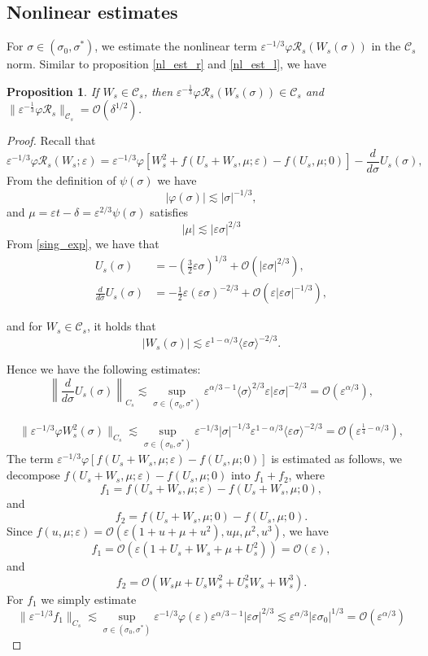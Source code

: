 \documentclass[letterpaper,11pt]{article}
\newcommand{\Ral}{\mathcal{R}}
\newcommand{\rmO}{\mathcal{O}}
\newcommand{\eps}{\varepsilon}
\newcommand{\lar}{ \lesssim }
\numberwithin{equation}{section}
\theoremstyle{plain}
\newtheorem{proposition}[theorem]{Proposition}
\begin{document}
\subsection{Nonlinear estimates}
For $\sigma \in (\sigma_0, \sigma^*)$, we estimate the nonlinear term $\eps^{-1/3}\varphi \Ral_s(W_s(\sigma))$ in the $\mathcal{C}_s$ norm. Similar to proposition \ref{nl_est_r} and \ref{nl_est_l}, we have
\begin{proposition}\label{nl_est_s} If $W_s \in \mathcal{C}_s$, then $\eps^{-\frac{1}{3}}\varphi \Ral_s(W_s(\sigma))  \in \mathcal{C}_{s}$ and $\| \eps^{-\frac{1}{3}}\varphi \Ral_s \|_{\mathcal{C}_s} = \rmO(\delta^{1/2})$.
\end{proposition}

\begin{proof}
Recall that
\[
\eps^{-1/3}\varphi\Ral_s(W_s;\eps) = \eps^{-1/3}\varphi\left[  W_s^2+ f(U_s+W_s, \mu ; \eps)-f(U_s,\mu;0) \right]- \frac{d}{d\sigma}U_s(\sigma),
\]
From the definition of $\psi(\sigma)$ we have
\[
|\varphi(\sigma)|  \lar | \sigma |^{-1/3},
\]
and $\mu = \eps t -\delta = \eps^{2/3} \psi(\sigma)$ satisfies
\[
|\mu | \lar |\eps\sigma|^{2/3}
\] 
From \eqref{sing_exp}, we have that
\begin{align*}
U_s(\sigma)  &= -\left(\frac{3}{2}\eps \sigma\right)^{1/3} + \rmO(|\eps \sigma|^{2/3} ),
\\
\frac{d}{d\sigma}U_s(\sigma) &= -\frac{1}{2}\eps(\eps\sigma)^{-2/3} + \rmO(\eps|\eps \sigma|^{-1/3}),
\end{align*}

and for $W_s \in \mathcal{C}_s$, it holds that
\[
|W_s(\sigma)| \lar \eps^{1-\alpha/3}\langle \eps \sigma\rangle^{-2/3}.
\]

Hence we have the following estimates:
\[
\left\|\frac{d}{d\sigma}U_s(\sigma) \right\|_{C_s}  \lar \sup_{\sigma \in (\sigma_0, \sigma^{*})}\eps^{\alpha/3-1}\langle \sigma\rangle^{2/3} \eps|\eps \sigma|^{-2/3} = \rmO(\eps^{\alpha/3}),
\]

\[
\|\eps^{-1/3}\varphi W_s^2(\sigma) \|_{C_s}  \lar \sup_{\sigma \in (\sigma_0, \sigma^{*})}\eps^{-1/3}|\sigma|^{-1/3}\eps^{1-\alpha/3}\langle \eps \sigma\rangle^{-2/3} = \rmO(\eps^{\frac{1}{4}-\alpha/3}),
\]
The term $\eps^{-1/3}\varphi[ f(U_s+W_s, \mu; \eps)-f(U_s,\mu; 0) ]$ is estimated as follows, we decompose $f(U_s+W_s,\mu;\eps)-f(U_s,\mu;0)$ into $f_1 + f_2$, where
\[
f_1 = f(U_s+W_s,\mu;\eps) - f(U_s+W_s,\mu;0),
\]
and 
\[
f_2 = f(U_s+W_s,\mu;0)  - f(U_s, \mu; 0).
\]
Since $f(u,\mu ; \eps) = \rmO(\eps(1+u+\mu+u^2), u\mu,\mu^2,u^3)$, we have
\[
f_1 = \rmO(\eps(1+U_s+W_s+\mu+U_s^2)) = \rmO(\eps),
\]
and 
\[
f_2 = \rmO( W_s\mu + U_sW_s^2+U_s^2W_s+W_s^3).
\]
For $f_1$ we simply estimate
\[
\| \eps^{-1/3}f_1\|_{C_s} \lar \sup_{\sigma \in (\sigma_0, \sigma^{*})} \eps^{-1/3}\varphi (\eps) \eps^{\alpha/3-1}|\eps\sigma|^{2/3} \lar \eps^{\alpha/3}|\eps\sigma_0|^{1/3} = \rmO(\eps^{\alpha/3})
\]


\end{proof}
\end{document}
